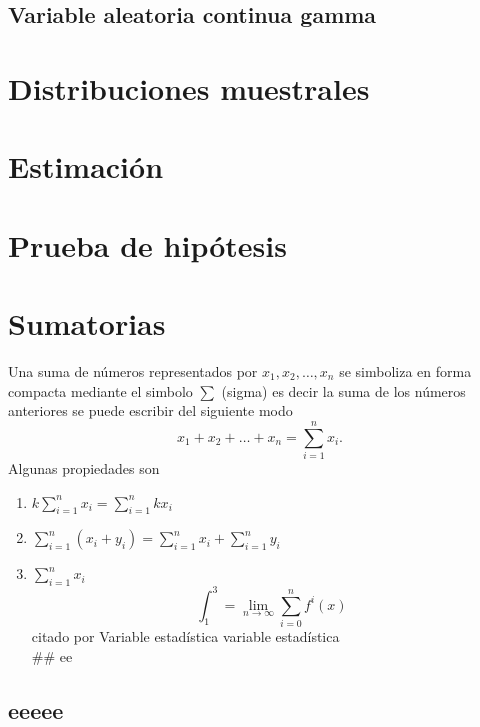 \documentclass[10pt,]{krantz}
\providecommand{\tightlist}{%
  \setlength{\itemsep}{0pt}\setlength{\parskip}{0pt}}
\theoremstyle{definition}
\theoremstyle{definition}
\theoremstyle{definition}
\theoremstyle{remark}
\begin{document}
\hypertarget{variable-aleatoria-continua-gamma}{%
\section{Variable aleatoria continua gamma}\label{variable-aleatoria-continua-gamma}}

\hypertarget{distribuciones-muestrales}{%
\chapter{Distribuciones muestrales}\label{distribuciones-muestrales}}

\hypertarget{estimaciuxf3n}{%
\chapter{Estimación}\label{estimaciuxf3n}}

\hypertarget{prueba-de-hipuxf3tesis}{%
\chapter{Prueba de hipótesis}\label{prueba-de-hipuxf3tesis}}

\hypertarget{appendix-apendice}{%
\appendix {}}


\hypertarget{sumatorias}{%
\chapter{Sumatorias}\label{sumatorias}}

Una suma de números representados por \(x_1, x_2, \ldots, x_n\) se simboliza en forma compacta mediante el simbolo \(\sum\) (sigma) es decir la suma de los números anteriores se puede escribir del siguiente modo \[x_1+x_2+\dots+x_n=\sum_{i=1}^nx_i.\]
Algunas propiedades son

\begin{enumerate}
\def\labelenumi{\arabic{enumi}.}
\tightlist
\item
  \(k\sum_{i=1}^nx_i=\sum_{i=1}^nkx_i\)
\item
  \(\sum_{i=1}^n\left(x_i+y_i\right)=\sum_{i=1}^nx_i+\sum_{i=1}^ny_i\)
\item
  \(\sum_{i=1}^nx_i\)
  \[\int_1^3=\lim_{n\to \infty}\sum_{i=0}^{n}f^i(x)\]
  citado por \citep{xie2015}
  Variable estadística variable estadística\\
  \#\# ee
\end{enumerate}

\hypertarget{eeeee}{%
\section{eeeee}\label{eeeee}}
\end{document}
